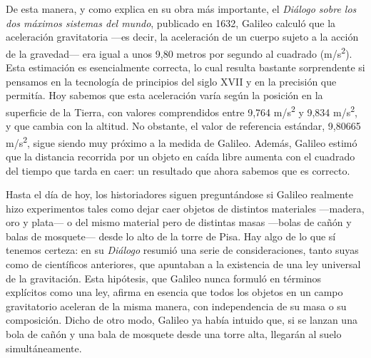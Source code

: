 De esta manera, y como explica en su obra más importante, el \emph{Diálogo sobre los
dos máximos sistemas del mundo}, publicado en 1632, Galileo calculó que la aceleración
gravitatoria ---es decir, la aceleración de un cuerpo sujeto a la acción de la
gravedad--- era igual a unos 9,80 metros por segundo al cuadrado
(m/s\textsuperscript{2}). Esta estimación es esencialmente correcta, lo cual resulta
bastante sorprendente si pensamos en la tecnología de principios del siglo XVII y
en la precisión que permitía. Hoy sabemos que esta aceleración varía según la
posición en la superficie de la Tierra, con valores comprendidos entre
9,764 m/s\textsuperscript{2} y 9,834 m/s\textsuperscript{2}, y que cambia con la
altitud. No obstante, el valor de referencia estándar, 9,80665 m/s\textsuperscript{2},
sigue siendo muy próximo a la medida de Galileo. Además, Galileo estimó que la
distancia recorrida por un objeto en caída libre aumenta con el cuadrado del tiempo
que tarda en caer: un resultado que ahora sabemos que es correcto.

Hasta el día de hoy, los historiadores siguen preguntándose si Galileo realmente
hizo experimentos tales como dejar caer objetos de distintos materiales ---madera,
oro y plata--- o del mismo material pero de distintas masas ---bolas de cañón y
balas de mosquete--- desde lo alto de la torre de Pisa. Hay algo de lo que sí
tenemos certeza: en su \emph{Diálogo} resumió una serie de consideraciones, tanto
suyas como de científicos anteriores, que apuntaban a la existencia de una ley
universal de la gravitación. Esta hipótesis, que Galileo nunca formuló en términos
explícitos como una ley, afirma en esencia que todos los objetos en un campo
gravitatorio aceleran de la misma manera, con independencia de su masa o su
composición. Dicho de otro modo, Galileo ya había intuido que, si se lanzan una
bola de cañón y una bala de mosquete desde una torre alta, llegarán al suelo
simultáneamente.

